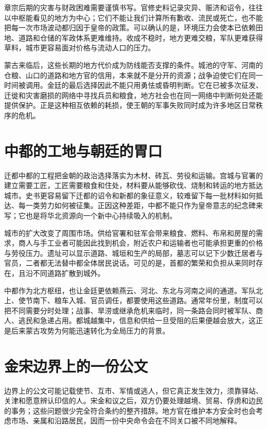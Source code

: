 章宗后期的灾害与财政困难需要谨慎书写。官修史料记录灾异、赈济和诏令，往往以中枢能看见的地方为中心；它们不能让我们计算所有歉收、流民或死亡，也不能把每一次市场波动都归因于皇帝的政策。可以确认的是，环境压力会使本已依赖田地、道路和仓储的军政体系更难维持。收成不稳时，地方更难交粮，军队更难获得草料，城市更容易面对价格与流动人口的压力。

蒙古来临后，这些长期的地方代价成为防线能否支撑的条件。城池的守军、河南的仓粮、山口的道路和地方官的信用，本来就不是分开的资源；战争迫使它们在同一时间被调用。金廷的最后选择因此不能只用勇怯或昏明判断。它在已被多次征发、迁徙和灾害磨损的网络中寻找兵员和粮食，地方社会也在同一网络中判断何处还能提供保护。正是这种相互依赖的耗损，使王朝的军事失败同时成为许多地区日常秩序的危机。

\section{中都的工地与朝廷的胃口}

迁都中都的工程把金朝的政治选择落实为木材、砖瓦、劳役和运输。宫城与官署的建立需要工匠，工匠需要粮食和住处，材料要从能够砍伐、烧制和转运的地方抵达城市。史书更容易留下迁都的诏令和新都的象征意义，较难留下每一批材料如何抵达、每一类劳力如何被征集。正因这种差距，中都不能只作为皇帝意志的纪念碑来写；它也是将华北资源向一个新中心持续吸入的机制。

城市的扩大改变了周围市场。供给官署和驻军会带来粮食、燃料、布帛和房屋的需求，商人与手工业者可能因此找到机会，附近农户和运输者也可能承担更重的价格与劳役压力。遗址可以显示道路、城垣和生产的局部，墓志可以记下少数迁居者与官员，二者都无法替中都全体居民说话。可见的是，首都的繁荣和负担从来同时存在，且沿不同道路扩散到城外。

中都作为北方枢纽，也让金廷更依赖燕云、河北、东北与河南之间的通道。军队北上、使节南下、粮车入城、官员调任，都要使用这些道路。通常年份里，制度可以把不同需要分时处理；战事、旱涝或继承危机来临时，同一条路会同时被军队、商人、逃民和急递占用。都城越集中，信息和供给一旦受阻的后果便越会放大，这正是后来蒙古攻势为何能迅速转化为全局压力的背景。

\section{金宋边界上的一份公文}

边界上的公文可能记载使节、互市、军情或逃人，但它真正发生效力，须靠驿站、关津和愿意辨认印信的人。宋金和议之后，双方仍要处理越境、贸易、俘虏和边民的事务；这些问题很少完全符合条约的整齐措辞。地方官在维护本方安全时也会考虑市场、亲属和沿路居民，因而一份中央命令会在不同关口被不同地解释。


